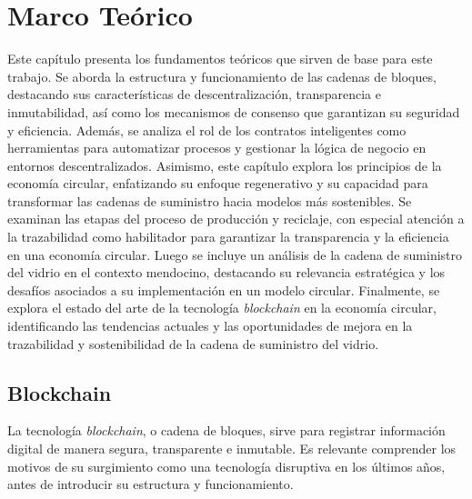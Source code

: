 \chapter[Marco Teórico]{Marco Teórico}
\label{cp:theoretical-framework}

\parindent0pt


Este capítulo presenta los fundamentos teóricos que sirven de base para este trabajo. Se aborda la estructura y funcionamiento de las cadenas de bloques, destacando sus características de descentralización, transparencia e inmutabilidad, así como los mecanismos de consenso que garantizan su seguridad y eficiencia. Además, se analiza el rol de los contratos inteligentes como herramientas para automatizar procesos y gestionar la lógica de negocio en entornos descentralizados. Asimismo, este capítulo explora los principios de la economía circular, enfatizando su enfoque regenerativo y su capacidad para transformar las cadenas de suministro hacia modelos más sostenibles. Se examinan las etapas del proceso de producción y reciclaje, con especial atención a la trazabilidad como habilitador para garantizar la transparencia y la eficiencia en una economía circular. Luego se incluye un análisis de la cadena de suministro del vidrio en el contexto mendocino, destacando su relevancia estratégica y los desafíos asociados a su implementación en un modelo circular. Finalmente, se explora el estado del arte de la tecnología \textit{blockchain} en la economía circular, identificando las tendencias actuales y las oportunidades de mejora en la trazabilidad y sostenibilidad de la cadena de suministro del vidrio.

\section{Blockchain}

La tecnología \textit{blockchain}, o cadena de bloques, sirve para registrar información digital de manera segura, transparente e inmutable. Es relevante comprender los motivos de su surgimiento como una tecnología disruptiva en los últimos años, antes de introducir su estructura y funcionamiento.

